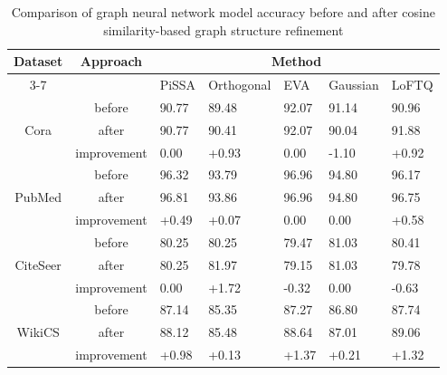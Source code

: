 \documentclass{article}
\begin{document}
\begin{table}[ht]
\centering
\caption{Comparison of graph neural network model accuracy before and after cosine similarity-based graph structure refinement}
\label{tab:changing_after_cosine_enhancer_gnns_percentage}
\begin{tabularx}{\linewidth}{c c || *{5}{X}}
\hline
\multirow{2}{*}{Dataset} &
\multirow{2}{*}{Approach} &
\multicolumn{5}{c}{Method} \\
\cline{3-7}
 &  & PiSSA & Orthogonal & EVA & Gaussian & LoFTQ \\
\hline
\multirow{3}{*}{Cora}
 & before
 & 90.77 & 89.48 & 92.07 & 91.14 & 90.96 \\
\cline{2-7}
 & after
 & 90.77 & 90.41 & 92.07 & 90.04 & 91.88 \\
\cline{2-7}
 & improvement
 & 0.00 & +0.93 & 0.00 & -1.10 & +0.92 \\
\hline
\hline
\multirow{3}{*}{PubMed}
 & before
 & 96.32 & 93.79 & 96.96 & 94.80 & 96.17 \\
\cline{2-7}
 & after
 & 96.81 & 93.86 & 96.96 & 94.80 & 96.75 \\
\cline{2-7}
 & improvement
 & +0.49 & +0.07 & 0.00 & 0.00 & +0.58 \\
\hline
\hline
\multirow{3}{*}{CiteSeer}
 & before
 & 80.25 & 80.25 & 79.47 & 81.03 & 80.41 \\
\cline{2-7}
 & after
 & 80.25 & 81.97 & 79.15 & 81.03 & 79.78 \\
\cline{2-7}
 & improvement
 & 0.00 & +1.72 & -0.32 & 0.00 & -0.63 \\
\hline
\hline
\multirow{3}{*}{WikiCS}
 & before
 & 87.14 & 85.35 & 87.27 & 86.80 & 87.74 \\
\cline{2-7}
 & after
 & 88.12 & 85.48 & 88.64 & 87.01 & 89.06 \\
\cline{2-7}
 & improvement
 & +0.98 & +0.13 & +1.37 & +0.21 & +1.32 \\
\hline
\end{tabularx}
\end{table}
\end{document}
